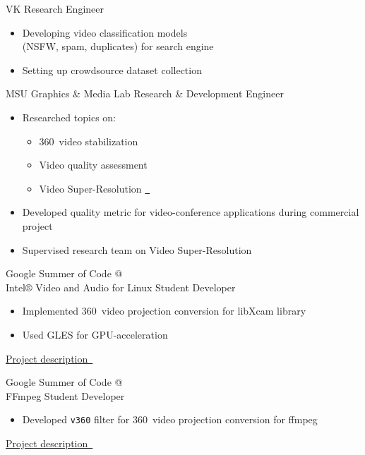 \documentclass{tccv}
\newcommand{\sphere}{360\textdegree~}
\begin{document}
\begin{eventlist}

     {VK}
     {Research Engineer}
\begin{itemize}
     \item Developing video classification models \\ (NSFW, spam, duplicates) for search engine
     \item Setting up crowdsource dataset collection
\end{itemize}

     {MSU Graphics \& Media Lab}
     {Research \& Development Engineer}
\vspace{-10pt} %
\begin{itemize}
     \item Researched topics on:
     \begin{itemize}
          \item \sphere video stabilization
          \item Video quality assessment
          \item Video Super-Resolution \href{https://videoprocessing.ai/benchmarks/video-super-resolution.html}{~\faExternalLink*}
     \end{itemize}
     \item Developed quality metric for video-conference applications during commercial project
     \item Supervised research team on Video Super-Resolution
\end{itemize}

     {Google Summer of Code @ \\ Intel® Video and Audio for Linux}
     {Student Developer}
\begin{itemize}
     \item Implemented \sphere video projection conversion for libXcam library
     \item Used GLES for GPU-acceleration
\end{itemize}
\href{https://unishift.github.io/project/2021-08-20-gsoc-libxcam}{Project description~\faExternalLink*}

     {Google Summer of Code @ \\ FFmpeg}
     {Student Developer}
\begin{itemize}
     \item Developed \texttt{v360} filter for \sphere video projection conversion for ffmpeg
\end{itemize}
\href{https://unishift.github.io/project/2019-08-26-gsoc-ffmpeg}{Project description~\faExternalLink*}

\end{eventlist}
\end{document}
